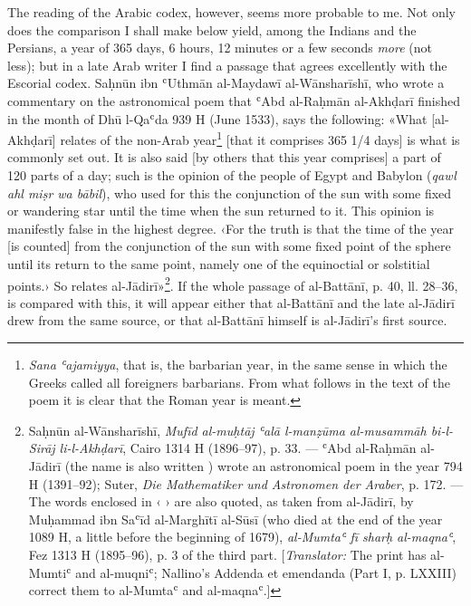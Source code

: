 \documentclass[11pt]{article}
\newcommand{\Pg}[1]{\marginpar{\footnotesize\color{gray}#1}}
\begin{document}
\par \Pg{I 205}The reading of the Arabic codex, however, seems more probable to me. Not only does the comparison I shall make below yield, among the Indians and the Persians, a year of 365 days, 6 hours, 12 minutes or a few seconds \emph{more} (not less); but in a late Arab writer I find a passage that agrees excellently with the Escorial codex. Saḥnūn ibn ʿUthmān al-Maydawī al-Wānsharīshī, who wrote a commentary on the astronomical poem that ʿAbd al-Raḥmān al-Akhḍarī finished in the month of Dhū l-Qaʿda 939 H (June 1533), says the following: «What [al-Akhḍarī] relates of the non-Arab year\footnote{\emph{Sana ʿajamiyya}, that is, the barbarian year, in the same sense in which the Greeks called all foreigners barbarians. From what follows in the text of the poem it is clear that the Roman year is meant.} [that it comprises 365 1/4 days] is what is commonly set out. It is also said [by others that this year comprises] a part of 120 parts of a day; such is the opinion of the people of Egypt and Babylon (\emph{qawl ahl miṣr wa bābil}), who used for this the conjunction of the sun with some fixed or wandering star until the time when the sun returned to it. This opinion is manifestly false in the highest degree. ‹For the truth is that the time of the year [is counted] from the conjunction of the sun with some fixed point of the sphere until its return to the same point, namely one of the equinoctial or solstitial points.› So relates al-Jādirī»\footnote{Saḥnūn al-Wānsharīshī, \emph{Mufīd al-muḥtāj ʿalā l-manẓūma al-musammāh bi-l-Sirāj li-l-Akhḍarī}, Cairo 1314 H (1896–97), p. 33. — ʿAbd al-Raḥmān al-Jādirī (the name is also written ) wrote an astronomical poem in the year 794 H (1391–92); Suter, \emph{Die Mathematiker und Astronomen der Araber}, p. 172. — The words enclosed in ‹ › are also quoted, as taken from al-Jādirī, by Muḥammad ibn Saʿīd al-Marghītī al-Sūsī (who died at the end of the year 1089 H, a little before the beginning of 1679), \emph{al-Mumtaʿ fī sharḥ al-maqnaʿ}, Fez 1313 H (1895–96), p. 3 of the third part. [\emph{Translator:} The print has al-Mumtiʿ and al-muqniʿ; Nallino's Addenda et emendanda (Part I, p. LXXIII) correct them to al-Mumtaʿ and al-maqnaʿ.]}. If the whole passage of al-Battānī, p. 40, ll. 28–36, is compared with this, it will appear either that al-Battānī and the late al-Jādirī drew from the same source, or that al-Battānī himself is al-Jādirī's first source.\par
\end{document}

